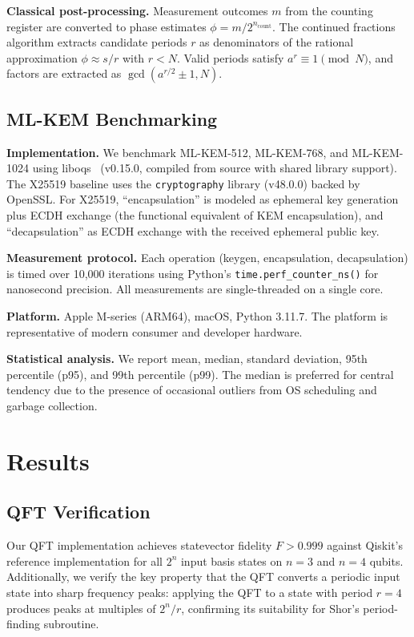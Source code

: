 \documentclass[conference]{IEEEtran}
\begin{document}
\textbf{Classical post-processing.} Measurement outcomes $m$ from the counting register are converted to phase estimates $\phi = m / 2^{n_\text{count}}$. The continued fractions algorithm extracts candidate periods $r$ as denominators of the rational approximation $\phi \approx s/r$ with $r < N$. Valid periods satisfy $a^r \equiv 1 \pmod{N}$, and factors are extracted as $\gcd(a^{r/2} \pm 1, N)$.

\subsection{ML-KEM Benchmarking}

\textbf{Implementation.} We benchmark ML-KEM-512, ML-KEM-768, and ML-KEM-1024 using liboqs~\cite{liboqs2024} (v0.15.0, compiled from source with shared library support). The X25519 baseline uses the \texttt{cryptography} library (v48.0.0) backed by OpenSSL. For X25519, ``encapsulation'' is modeled as ephemeral key generation plus ECDH exchange (the functional equivalent of KEM encapsulation), and ``decapsulation'' as ECDH exchange with the received ephemeral public key.

\textbf{Measurement protocol.} Each operation (keygen, encapsulation, decapsulation) is timed over 10,000 iterations using Python's \texttt{time.perf\_counter\_ns()} for nanosecond precision. All measurements are single-threaded on a single core.

\textbf{Platform.} Apple M-series (ARM64), macOS, Python 3.11.7. The platform is representative of modern consumer and developer hardware.

\textbf{Statistical analysis.} We report mean, median, standard deviation, 95th percentile (p95), and 99th percentile (p99). The median is preferred for central tendency due to the presence of occasional outliers from OS scheduling and garbage collection.

\section{Results}
\label{sec:results}

\subsection{QFT Verification}

Our QFT implementation achieves statevector fidelity $F > 0.999$ against Qiskit's reference implementation for all $2^n$ input basis states on $n = 3$ and $n = 4$ qubits. Additionally, we verify the key property that the QFT converts a periodic input state into sharp frequency peaks: applying the QFT to a state with period $r = 4$ produces peaks at multiples of $2^n / r$, confirming its suitability for Shor's period-finding subroutine.
\end{document}
